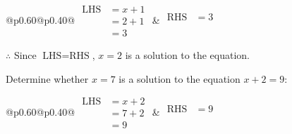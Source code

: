 \documentclass[12pt]{article}
\newcounter{minipagecount}
\begin{document}
\begin{multicols}{2}
\begin{minipage}[t]{0.40\textwidth}
    \noindent
    \renewcommand{\arraystretch}{1.3} %
    \begin{tabular}{@{}p{0.60\linewidth}@{}p{0.40\linewidth}@{}}
        \(\begin{aligned}
            \text{LHS} &= x + 1 \\
                    &= 2 + 1 \\
                    &= 3
        \end{aligned}\) &
        \(\begin{aligned}
            \text{RHS} &= 3\\
                    & \\
                    &
        \end{aligned}\)
    \end{tabular}
    \renewcommand{\arraystretch}{1.0} %
    \vspace{2pt}  %

    \noindent \(\therefore\) Since \(\text{LHS} = \text{RHS}\), \(x = 2\) is  a solution to the equation.

\end{minipage}

 \vspace*{16pt}
\noindent{(\theminipagecount)}\hspace{0.1mm} %
\begin{minipage}[t]{0.40\textwidth} %

    \noindent Determine whether \(x = 7\) is a solution to the equation \(x + 2 = 9\):
    \vspace{4pt}  %

    \noindent
    \renewcommand{\arraystretch}{1.3} %
    \begin{tabular}{@{}p{0.60\linewidth}@{}p{0.40\linewidth}@{}}
        \(\begin{aligned}
            \text{LHS} &= x + 2 \\
                    &= 7 + 2 \\
                    &= 9
        \end{aligned}\) &
        \(\begin{aligned}
            \text{RHS} &= 9\\
                    & \\
                    &
        \end{aligned}\)
    \end{tabular}
    \renewcommand{\arraystretch}{1.0} %
    \vspace{2pt}  %


\end{minipage}
\end{multicols}
\end{document}
